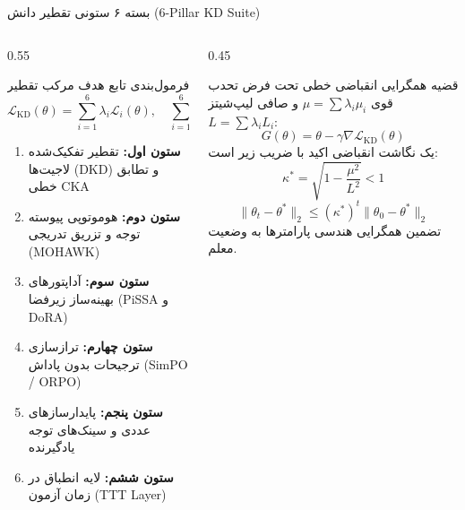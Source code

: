 \documentclass[aspectratio=169,10pt]{beamer}
\begin{document}
\begin{frame}{بسته ۶ ستونی تقطیر دانش (6-Pillar KD Suite)}
  \begin{columns}
    \begin{column}{0.55\textwidth}
      \begin{block}{فرمول‌بندی تابع هدف مرکب تقطیر}
        \[
          \mathcal{L}_{\text{KD}}(\theta) = \sum_{i=1}^6 \lambda_i \mathcal{L}_i(\theta), \quad \sum_{i=1}^6 \lambda_i = 1, \quad \lambda_i > 0
        \]
        \begin{enumerate}\footnotesize
          \item \textbf{ستون اول:} تقطیر تفکیک‌شده لاجیت‌ها (DKD) و تطابق خطی CKA
          \item \textbf{ستون دوم:} هوموتوپی پیوسته توجه و تزریق تدریجی (MOHAWK)
          \item \textbf{ستون سوم:} آداپتورهای بهینه‌ساز زیرفضا (PiSSA و DoRA)
          \item \textbf{ستون چهارم:} ترازسازی ترجیحات بدون پاداش (SimPO / ORPO)
          \item \textbf{ستون پنجم:} پایدارسازهای عددی و سینک‌های توجه یادگیرنده
          \item \textbf{ستون ششم:} لایه انطباق در زمان آزمون (TTT Layer)
        \end{enumerate}
      \end{block}
    \end{column}

    \begin{column}{0.45\textwidth}
      \begin{exampleblock}{قضیه همگرایی انقباضی خطی}
        تحت فرض تحدب قوی $\mu = \sum \lambda_i \mu_i$ و صافی لیپ‌شیتز $L = \sum \lambda_i L_i$:
        \[
          G(\theta) = \theta - \gamma \nabla \mathcal{L}_{\text{KD}}(\theta)
        \]
        یک نگاشت انقباضی اکید با ضریب زیر است:
        \[
          \kappa^* = \sqrt{1 - \frac{\mu^2}{L^2}} < 1
        \]
        \[
          \|\theta_t - \theta^*\|_2 \le (\kappa^*)^t \|\theta_0 - \theta^*\|_2
        \]
        تضمین همگرایی هندسی پارامترها به وضعیت معلم.
      \end{exampleblock}
    \end{column}
  \end{columns}
\end{frame}
\end{document}
